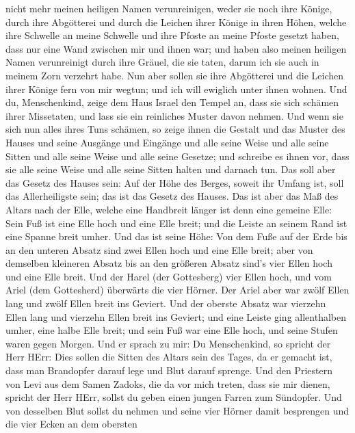 nicht mehr meinen heiligen Namen verunreinigen, weder sie noch ihre
Könige, durch ihre Abgötterei und durch die Leichen ihrer Könige in
ihren Höhen,  welche ihre Schwelle an meine Schwelle und
ihre Pfoste an meine Pfoste gesetzt haben, dass nur eine Wand zwischen
mir und ihnen war; und haben also meinen heiligen Namen verunreinigt
durch ihre Gräuel, die sie taten, darum ich sie auch in meinem Zorn
verzehrt habe.  Nun aber sollen sie ihre Abgötterei und die
Leichen ihrer Könige fern von mir wegtun; und ich will ewiglich unter
ihnen wohnen.  Und du, Menschenkind, zeige dem Haus Israel
den Tempel an, dass sie sich schämen ihrer Missetaten, und lass sie ein
reinliches Muster davon nehmen.  Und wenn sie sich nun
alles ihres Tuns schämen, so zeige ihnen die Gestalt und das Muster des
Hauses und seine Ausgänge und Eingänge und alle seine Weise und alle
seine Sitten und alle seine Weise und alle seine Gesetze; und schreibe
es ihnen vor, dass sie alle seine Weise und alle seine Sitten halten und
darnach tun.  Das soll aber das Gesetz des Hauses sein: Auf
der Höhe des Berges, soweit ihr Umfang ist, soll das Allerheiligste
sein; das ist das Gesetz des Hauses.  Das ist aber das Maß
des Altars nach der Elle, welche eine Handbreit länger ist denn eine
gemeine Elle: Sein Fuß ist eine Elle hoch und eine Elle breit; und die
Leiste an seinem Rand ist eine Spanne breit umher.  Und das
ist seine Höhe: Von dem Fuße auf der Erde bis an den unteren Absatz sind
zwei Ellen hoch und eine Elle breit; aber von demselben kleineren Absatz
bis an den größeren Absatz sind's vier Ellen hoch und eine Elle breit.
 Und der Harel (der Gottesberg) vier Ellen hoch, und vom
Ariel (dem Gottesherd) überwärts die vier Hörner.  Der
Ariel aber war zwölf Ellen lang und zwölf Ellen breit ins Geviert.
 Und der oberste Absatz war vierzehn Ellen lang und
vierzehn Ellen breit ins Geviert; und eine Leiste ging allenthalben
umher, eine halbe Elle breit; und sein Fuß war eine Elle hoch, und seine
Stufen waren gegen Morgen.  Und er sprach zu mir: Du
Menschenkind, so spricht der Herr HErr: Dies sollen die Sitten des
Altars sein des Tages, da er gemacht ist, dass man Brandopfer darauf
lege und Blut darauf sprenge.  Und den Priestern von Levi
aus dem Samen Zadoks, die da vor mich treten, dass sie mir dienen,
spricht der Herr HErr, sollst du geben einen jungen Farren zum
Sündopfer.  Und von desselben Blut sollst du nehmen und
seine vier Hörner damit besprengen und die vier Ecken an dem obersten
